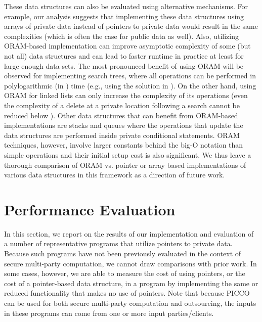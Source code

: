 \documentclass[11pt]{article}
\begin{document}
These data structures can also be evaluated using alternative mechanisms.
For example, our analysis suggests that implementing these data structures
using arrays of private data instead of pointers to private data would
result in the same complexities (which is often the case for public data as
well). Also, utilizing ORAM-based implementation can improve asymptotic
complexity of some (but not all) data structures and can lead to faster
runtime in practice at least for large enough data sets. The most pronounced
benefit of using ORAM will be observed for implementing search trees, where
all operations can be performed in polylogarithmic (in ) time (e.g.,
using the solution in \cite{Wang14}). On the other hand, using ORAM for
linked lists can only increase the complexity of its operations (even the
complexity of a delete at a private location following a search cannot be
reduced below ). Other data structures that can benefit from
ORAM-based implementations are stacks and queues where the operations that
update the data structures are performed inside private conditional
statements. ORAM techniques, however, involve larger constants behind the
big-O notation than simple operations and their initial setup cost is also
significant. We thus leave a thorough comparison of ORAM vs. pointer or
array based implementations of various data structures in this framework as
a direction of future work.

\section{Performance Evaluation}
\label{sec:perf}

In this section, we report on the results of our implementation and
evaluation of a number of representative programs that utilize pointers to
private data. Because such programs have not been previously evaluated in
the context of secure multi-party computation, we cannot draw comparisons
with prior work. In some cases, however, we are able to measure the cost of
using pointers, or the cost of a pointer-based data structure, in a program by
implementing the same or reduced functionality that makes no use of pointers. 
Note that because PICCO can be used for both secure multi-party computation
and outsourcing, the inputs in these programs can come from one or more
input parties/clients.
\end{document}
